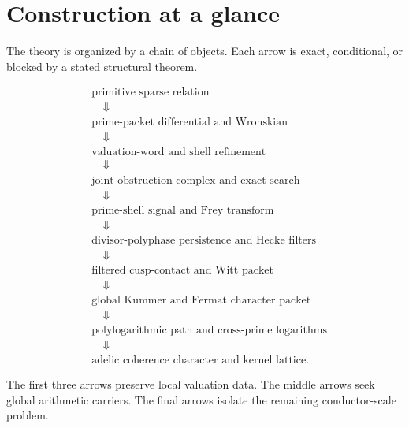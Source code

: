 
\section{Construction at a glance}
The theory is organized by a chain of objects. Each arrow is exact, conditional, or blocked by a stated structural theorem.

\[
\boxed{
\begin{aligned}
&\text{primitive sparse relation}\\
&\quad\Downarrow\\
&\text{prime-packet differential and Wronskian}\\
&\quad\Downarrow\\
&\text{valuation-word and shell refinement}\\
&\quad\Downarrow\\
&\text{joint obstruction complex and exact search}\\
&\quad\Downarrow\\
&\text{prime-shell signal and Frey transform}\\
&\quad\Downarrow\\
&\text{divisor-polyphase persistence and Hecke filters}\\
&\quad\Downarrow\\
&\text{filtered cusp-contact and Witt packet}\\
&\quad\Downarrow\\
&\text{global Kummer and Fermat character packet}\\
&\quad\Downarrow\\
&\text{polylogarithmic path and cross-prime logarithms}\\
&\quad\Downarrow\\
&\text{adelic coherence character and kernel lattice}.
\end{aligned}}
\]

The first three arrows preserve local valuation data. The middle arrows seek global arithmetic carriers. The final arrows isolate the remaining conductor-scale problem.


